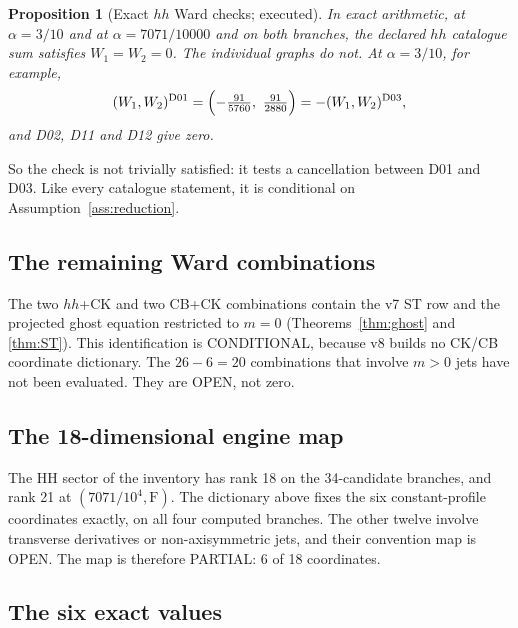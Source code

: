 \documentclass[11pt,a4paper]{article}
\newcommand{\Fr}{\mathrm F}
\newcommand{\OPEN}{\textsf{OPEN}}
\newcommand{\CONDITIONAL}{\textsf{CONDITIONAL}}
\newcommand{\PARTIAL}{\textsf{PARTIAL}}
\theoremstyle{plain}
\newtheorem{proposition}[theorem]{Proposition}
\theoremstyle{definition}
\theoremstyle{remark}
\numberwithin{equation}{section}
\begin{document}
\begin{proposition}[Exact \(hh\) Ward checks; executed]
\label{prop:v8hhward}
In exact arithmetic, at \(\alpha=3/10\) and at
\(\alpha=7071/10000\) and on both branches, the declared \(hh\) catalogue sum
satisfies \(W_1=W_2=0\).
The individual graphs do not. At \(\alpha=3/10\), for example,
\[
 (W_1,W_2)^{\rm D01}=\Bigl(-\tfrac{91}{5760},\ \tfrac{91}{2880}\Bigr)
 =-(W_1,W_2)^{\rm D03},
\]
and D02, D11 and D12 give zero.
\end{proposition}

\noindent
So the check is not trivially satisfied: it tests a cancellation
between D01 and D03. Like every catalogue statement, it is
conditional on Assumption~\ref{ass:reduction}.

\subsection{The remaining Ward combinations}

The two \(hh\)+CK and two CB+CK combinations contain the v7
ST row and the projected ghost equation restricted to \(m=0\)
(Theorems~\ref{thm:ghost} and \ref{thm:ST}). This identification
is \CONDITIONAL, because v8 builds no CK/CB coordinate dictionary.
The \(26-6=20\) combinations that involve \(m>0\) jets have not
been evaluated. They are \OPEN, not zero.

\subsection{The 18-dimensional engine map}

The HH sector of the inventory has rank 18 on the 34-candidate
branches, and rank 21 at \((7071/10^4,\Fr)\). The dictionary above
fixes the six constant-profile coordinates exactly, on all four
computed branches. The other twelve involve transverse
derivatives or non-axisymmetric jets, and their convention map is
\OPEN. The map is therefore \PARTIAL: 6 of 18 coordinates.

\subsection{The six exact values}
\end{document}

